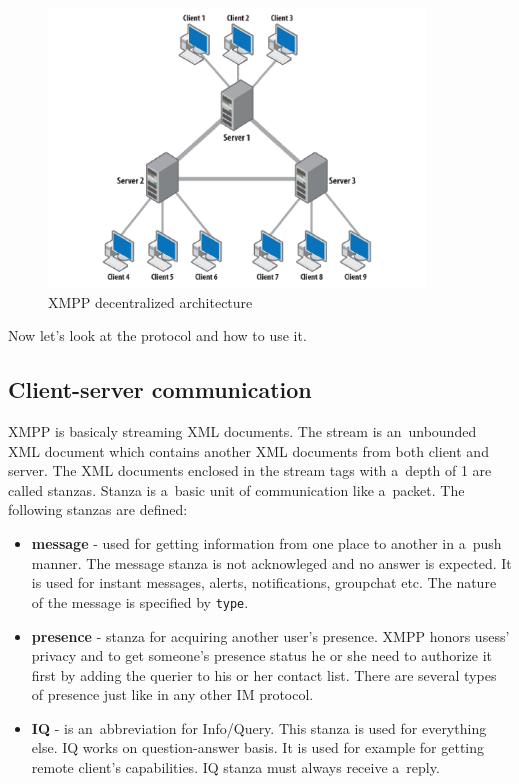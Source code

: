 \begin{figure}[ht]
\begin{center}
	\includegraphics[width=10cm]{fig/XMPP-decentralized-architecture.png}
	\caption{XMPP decentralized architecture \cite{xmppBook}}
	\label{fig:xmpp-decentralized-architecture}
\end{center}
\end{figure}

Now let's look at the protocol and how to use it. 

\subsection*{Client-server communication}
XMPP is basicaly streaming XML documents. The stream is an~unbounded XML document which contains another XML documents from both client and server. The XML documents enclosed in the stream tags with a~depth of 1 are called stanzas. Stanza is a~basic unit of communication like a~packet. The following stanzas are defined:

\begin{itemize}
	\item \textbf{message} - used for getting information from one place to another in a~push manner. The message stanza is not acknowleged and no answer is expected. It is used for instant messages, alerts, notifications, groupchat etc. The nature of the message is specified by \verb|type|.  
	\item \textbf{presence} - stanza for acquiring another user's presence. XMPP honors usess' privacy and to get someone's presence status he or she need to authorize it first by adding the querier to his or her contact list. There are several types of presence just like in any other IM protocol.     
	\item	\textbf{IQ} - is an~abbreviation for Info/Query. This stanza is used for everything else. IQ works on question-answer basis. It is used for example for getting remote client's capabilities. IQ stanza must always receive a~reply. 
\end{itemize}

